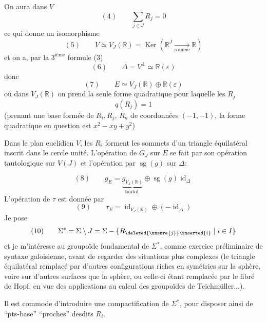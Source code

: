 On aura dans $V$
\[
(4)\qquad\sum_{j\in J}R_j=0
\]
ce qui donne un isomorphisme
\[
(5)\qquad V\simeq V_J(\mathbb R)=\operatorname{Ker}(\mathbb R^J\xrightarrow[\text{somme}]{}\mathbb R)
\]
et on a, par la $3^{\text{ième}}$ formule (3)
\[
(6)\qquad\Delta=V^\perp\simeq\mathbb R(\varepsilon)
\]
donc
\[
(7)\qquad E\simeq V_J(\mathbb R)\oplus\mathbb R(\varepsilon)
\]
où dans $V_J(\mathbb R)$ on prend la seule forme quadratique  pour laquelle les $R_j$   
\[
q(R_j)=1
\]
(prenant une base formée de $R_i,R_j$, $R_n$ de coordonnées $(-1,-1)$, la forme quadratique en question est $x^2-xy+y^2$)

Dans le plan euclidien $V$, les $R_i$  forment les sommets d'un triangle équilatéral inscrit dans le cercle unité. L'opération de $G_J$ sur $E$ se fait par son opération  tautologique sur $V(J)$ et l'opération par $\operatorname{sg}(g)$ sur $\Delta$:

\[
(8)\qquad g_E=\underbrace{g_{V_J(\mathbb R)}}_{\text{tautol.}}\oplus\operatorname{sg}(g)\operatorname{id}_\Delta
\]
L'opération de $\tau$ est donnée par
\[
(9)\qquad\tau_E=\operatorname{id}_{V_J(\mathbb R)}\oplus(-\operatorname{id}_\Delta)
\]
Je pose
\[
(10)\qquad\Sigma^*=\Sigma\setminus J=\Sigma-\{R_{\deleted{\unsure{j}}\inserted{i}}\mid i\in I\}
\]
et je m'intéresse au groupoïde fondamental de $\Sigma^*$, comme exercice préliminaire de syntaxe galoisienne, avant de regarder des situations  plus complexes (le triangle équilatéral remplacé par d'autres configurations riches en symétries sur la sphère, voire sur d'autres surfaces que la sphère, ou celle-ci étant remplacée par le fibré de Hopf, en vue des applications au calcul des groupoïdes de Teichmüller...).

Il est commode d'introduire une compactification de $\Sigma^*$, pour disposer ainsi de ``pts-base'' ``proches'' desdits $R_i$.

